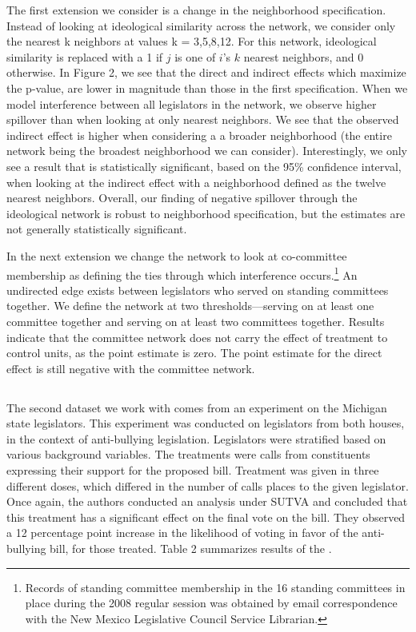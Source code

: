 \documentclass[12pt]{article}
\begin{document}
The first extension we consider is a change in the neighborhood specification. Instead of looking at ideological similarity across the network,  we consider only the nearest k neighbors at values k = 3,5,8,12.  For this network, ideological similarity is replaced with a 1 if $j$ is one of $i$'s $k$ nearest neighbors, and 0 otherwise. In Figure 2, we see that the direct and indirect effects which maximize the p-value, are lower in magnitude than those in the first specification. When we model interference between all legislators in the network, we observe higher spillover than when looking at only nearest neighbors. We see that the observed indirect effect is higher when considering a a broader neighborhood (the entire network being the broadest neighborhood we can consider).  Interestingly, we only see a result that is statistically significant, based on the 95\% confidence interval, when looking at the indirect effect with a neighborhood defined as the twelve nearest neighbors. Overall, our finding of negative spillover through the ideological network is robust to neighborhood specification, but the estimates are not generally statistically significant.
 


In the next extension we change the network to look at co-committee membership as defining the ties through which interference occurs.\footnote{Records of standing committee membership in the 16 standing committees in place during the 2008 regular session was obtained by email correspondence with the New Mexico Legislative Council Service Librarian.}  An undirected edge exists between legislators who served on standing committees together.  We define the network at two thresholds---serving on at least one committee together and serving on at least two committees together. Results indicate that the committee network does not carry the effect of treatment to control units, as the point estimate is zero. The point estimate for the direct effect is still negative with the committee network.



\subsection{\citet{bergan2015call}}


The second dataset we work with comes from an experiment on the Michigan state legislators. This experiment was conducted on legislators from both houses, in the context of anti-bullying legislation. Legislators were stratified based on various background variables. The treatments were calls from constituents expressing their support for the proposed bill. Treatment was given in three different doses, which differed in the number of calls places to the given legislator. Once again, the authors conducted an analysis under SUTVA and concluded that this treatment has a significant effect on the final vote on the bill. They observed a 12 percentage point increase in the likelihood of voting in favor of the anti-bullying bill, for those treated. Table 2 summarizes results of the \citet{bergan2015call}. 
\end{document}
